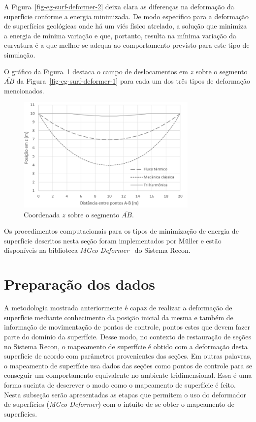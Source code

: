 A Figura~\ref{fig-eg-surf-deformer-2} deixa clara as diferenças na deformação da superfície conforme a energia minimizada. De modo específico para a deformação de superfícies geológicas onde há um viés físico atrelado, a solução que minimiza a energia de mínima variação e que, portanto, resulta na mínima variação da curvatura é a que melhor se adequa ao comportamento previsto para este tipo de simulação.

O gráfico da Figura~\ref{fig-eg-surf-deformer-3} destaca o campo de deslocamentos em $z$ sobre o segmento $\overline{AB}$ da Figura~\ref{fig-eg-surf-deformer-1} para cada um dos três tipos de deformação mencionados.

\begin{figure} [H]
  \begin{center}
    \includegraphics[width=250pt]{images/fig-eg-surf-deformer-3}
    \caption{Coordenada $z$ sobre o segmento $\overline{AB}$.\cite{Muller}}\label{fig-eg-surf-deformer-3}
  \end{center}
\end{figure}

Os procedimentos computacionais para os tipos de minimização de energia de superfície descritos nesta seção foram implementados por Müller e estão disponíveis na biblioteca \emph{MGeo Deformer}~\cite{Muller} do Sistema Recon.

\section{Preparação dos dados}
 
A metodologia mostrada anteriormente é capaz de realizar a deformação de superfície mediante conhecimento da posição inicial da mesma e também de informação de movimentação de pontos de controle, pontos estes que devem fazer parte do domínio da superfície. Desse modo, no contexto de restauração de seções no Sistema Recon, o mapeamento de superfície é obtido com a deformação desta superfície de acordo com parâmetros provenientes das seções. Em outras palavras, o mapeamento de superfície usa dados das seções como pontos de controle para se conseguir um comportamento equivalente no ambiente tridimensional. Essa é uma forma sucinta de descrever o modo como o mapeamento de superfície é feito. Nesta subseção serão apresentadas as etapas que permitem o uso do deformador de superfícies (\emph{MGeo Deformer}) com o intuito de se obter o mapeamento de superfícies.

